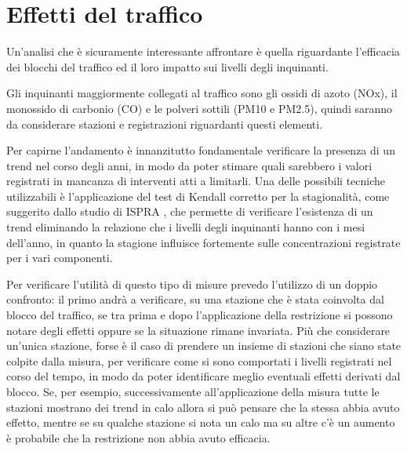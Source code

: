 \documentclass{article}
\begin{document}
\section{Effetti del traffico}
\label{sec:traffico}
Un'analisi che è sicuramente interessante affrontare è quella riguardante l'efficacia dei blocchi del traffico ed il loro impatto sui livelli degli inquinanti. 

Gli inquinanti maggiormente collegati al traffico sono gli ossidi di azoto (NOx), il monossido di carbonio (CO) e le polveri sottili (PM10 e PM2.5), quindi saranno da considerare stazioni e registrazioni riguardanti questi elementi.

Per capirne l'andamento è innanzitutto fondamentale verificare la presenza di un trend nel corso degli anni, in modo da poter stimare quali sarebbero i valori registrati in mancanza di interventi atti a limitarli. Una delle possibili tecniche utilizzabili è l'applicazione del test di Kendall corretto per la stagionalità, come suggerito dallo studio di ISPRA \cite{cattani2014analisi}, che permette di verificare l'esistenza di un trend eliminando la relazione che i livelli degli inquinanti hanno con i mesi dell'anno, in quanto la stagione influisce fortemente sulle concentrazioni registrate per i vari componenti.   

Per verificare l'utilità di questo tipo di misure prevedo l'utilizzo di un doppio confronto: il primo andrà a verificare, su una stazione che è stata coinvolta dal blocco del traffico, se tra prima e dopo l'applicazione della restrizione si possono notare degli effetti oppure se la situazione rimane invariata.
Più che considerare un'unica stazione, forse è il caso di prendere un insieme di stazioni che siano state colpite dalla misura, per verificare come si sono comportati i livelli registrati nel corso del tempo, in modo da poter identificare meglio eventuali effetti derivati dal blocco. Se, per esempio, successivamente all'applicazione della misura tutte le stazioni mostrano dei trend in calo allora si può pensare che la stessa abbia avuto effetto, mentre se su qualche stazione si nota un calo ma su altre c'è un aumento è probabile che la restrizione non abbia avuto efficacia.
\end{document}
